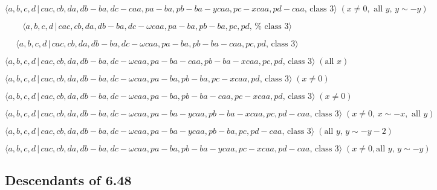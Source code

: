 \documentclass[10pt]{article}
\begin{document}
\begin{equation}
\langle a,b,c,d\,|\,cac,cb,da,db-ba,dc-caa,pa-ba,pb-ba-ycaa,pc-xcaa,pd-caa,\,%
\text{class }3\rangle \;(x\neq 0,\text{ all }y,\,y\sim -y)  \tag{7.4282}
\end{equation}

\begin{equation}
\langle a,b,c,d\,|\,cac,cb,da,db-ba,dc-\omega caa,pa-ba,pb-ba,pc,pd,\,\text{%
class }3\rangle  \tag{7.4283}
\end{equation}

\begin{equation}
\langle a,b,c,d\,|\,cac,cb,da,db-ba,dc-\omega caa,pa-ba,pb-ba-caa,pc,pd,\,%
\text{class }3\rangle  \tag{7.4284}
\end{equation}

\begin{equation}
\langle a,b,c,d\,|\,cac,cb,da,db-ba,dc-\omega
caa,pa-ba-caa,pb-ba-xcaa,pc,pd,\,\text{class }3\rangle \;(\text{all }x) 
\tag{7.4285}
\end{equation}

\begin{equation}
\langle a,b,c,d\,|\,cac,cb,da,db-ba,dc-\omega caa,pa-ba,pb-ba,pc-xcaa,pd,\,%
\text{class }3\rangle \;(x\neq 0)  \tag{7.4286}
\end{equation}

\begin{equation}
\langle a,b,c,d\,|\,cac,cb,da,db-ba,dc-\omega
caa,pa-ba,pb-ba-caa,pc-xcaa,pd,\,\text{class }3\rangle \;(x\neq 0) 
\tag{7.4287}
\end{equation}

\begin{equation}
\langle a,b,c,d\,|\,cac,cb,da,db-ba,dc-\omega
caa,pa-ba-ycaa,pb-ba-xcaa,pc,pd-caa,\,\text{class }3\rangle \;(x\neq
0,\,x\sim -x,\text{ all }y)  \tag{7.4288}
\end{equation}

\begin{equation}
\langle a,b,c,d\,|\,cac,cb,da,db-ba,dc-\omega
caa,pa-ba-ycaa,pb-ba,pc,pd-caa,\,\text{class }3\rangle \;(\text{all }%
y,\,y\sim -y-2)  \tag{7.4289}
\end{equation}

\begin{equation}
\langle a,b,c,d\,|\,cac,cb,da,db-ba,dc-\omega
caa,pa-ba,pb-ba-ycaa,pc-xcaa,pd-caa,\,\text{class }3\rangle \;(x\neq 0,\text{
all }y,\,y\sim -y)  \tag{7.4290}
\end{equation}

\subsection{Descendants of 6.48}
\end{document}
